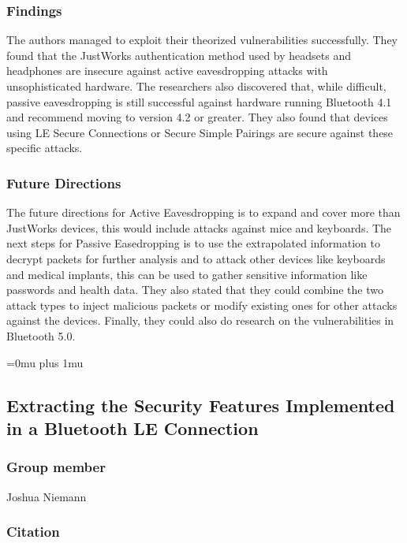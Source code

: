 \subsubsection{Findings}

\noindent
The authors managed to exploit their theorized vulnerabilities successfully.  They found that the JustWorks authentication method used by headsets and headphones are insecure against active eavesdropping attacks with unsophisticated hardware.  The researchers also discovered that, while difficult, passive eavesdropping is still successful against hardware running Bluetooth 4.1 and recommend moving to version 4.2 or greater.  They also found that devices using LE Secure Connections or Secure Simple Pairings are secure against these specific attacks.

\subsubsection{Future Directions}

\noindent
The future directions for Active Eavesdropping is to expand and cover more than JustWorks devices, this would include attacks against mice and keyboards.  The next steps for Passive Easedropping is to use the extrapolated information to decrypt packets for further analysis and to attack other devices like keyboards and medical implants, this can be used to gather sensitive information like passwords and health data.  They also stated that they could combine the two attack types to inject malicious packets or modify existing ones for other attacks against the devices.  Finally, they could also do research on the vulnerabilities in Bluetooth 5.0.

\Urlmuskip=0mu plus 1mu\relax

\subsection{Extracting the Security Features Implemented in a Bluetooth LE Connection}

\noindent
\subsubsection{Group member}
Joshua Niemann

\subsubsection{Citation}

